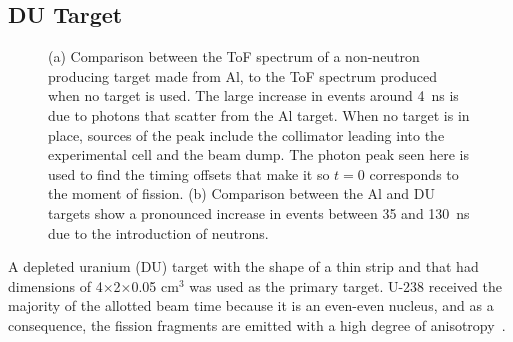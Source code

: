 \subsection{DU Target}
\label{subsection:targets}
\begin{figure}[]
\centering
    \caption{(a) Comparison between the ToF spectrum of a non-neutron producing target made from Al, to the ToF spectrum produced when no target is used.
    The large increase in events around 4~ns is due to photons that scatter from the Al target.
    When no target is in place, sources of the peak include the collimator leading into the experimental cell and the beam dump.
    The photon peak seen here is used to find the timing offsets that make it so $t=0$ corresponds to the moment of fission.
    (b) Comparison between the Al and DU targets show a pronounced increase in events between 35 and 130~ns due to the introduction of neutrons.}
    \label{fig:ToF}
\end{figure}
A depleted uranium (DU) target with the shape of a thin strip and that had dimensions of 4$\times$2$\times$0.05 $\text{cm}^3$ was used as the primary target.
U-238 received the majority of the allotted beam time because it is an even-even nucleus, and as a consequence, the fission fragments are emitted with a high degree of anisotropy~\cite{1977FragAss}.

